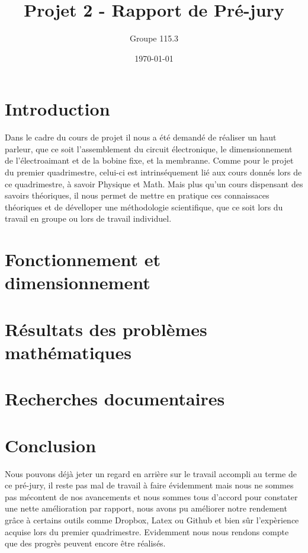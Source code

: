 \documentclass{report}
\title{Projet 2 - Rapport de Pré-jury}
\author{Groupe 115.3}
\date{\today}
\begin{document}
\maketitle
\tableofcontents
\clearpage

\chapter{Introduction}

Dans le cadre du cours de projet il nous a été demandé de réaliser un haut parleur, 
que ce soit l'assemblement du circuit électronique, le dimensionnement de l'électroaimant
et de la bobine fixe, et la membranne. Comme pour le projet du premier quadrimestre, 
celui-ci est intrinséquement lié aux cours donnés lors de ce quadrimestre, à savoir Physique
et Math. Mais plus qu'un cours dispensant des savoirs théoriques, il nous permet de mettre
en pratique ces connaissaces théoriques et de dévelloper une méthodologie scientifique, que 
ce soit lors du travail en groupe ou lors de travail individuel.

\chapter{Fonctionnement et dimensionnement}





\chapter{Résultats des problèmes mathématiques}





\chapter{Recherches documentaires}





\chapter{Conclusion}

Nous pouvons déjà jeter un regard en arrière sur le travail accompli au terme de ce pré-jury,
il reste pas mal de travail à faire évidemment mais nous ne sommes pas mécontent de nos 
avancements et nous sommes tous d'accord pour constater une nette amélioration par rapport, 
nous avons pu améliorer notre rendement grâce à certains outils comme Dropbox, Latex ou Github 
et bien sûr l'expèrience acquise lors du premier quadrimestre. Evidemment nous nous rendons compte 
que des progrès peuvent encore être réalisés.
\end{document}
